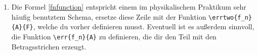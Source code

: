 \begin{enumerate}
\begin{loesung}
\begin{verbatim}
\renewcommand{\i}{\mathfrak{i}}
\newcommand{\complex}[1]{
  \re\left(#1\right)+\i\im\left(#1\right)}
\DeclareMathOperator{\re}{Re}
\DeclareMathOperator{\im}{Im}
                \end{verbatim}
            \end{loesung}
        \item Die Formel \eqref{fnfunction} entspricht einem im physikalischem 
            Praktikum sehr häufig benutztem Schema, ersetze diese Zeile mit der
            Funktion \verb|\errtwo{f_n}{A}{F}|, welche du vorher definieren musst.
            Eventuell ist es außerdem sinnvoll, die Funktion \verb|\err{f_n}{A}|
            zu definieren, die dir den Teil mit den Betragsstrichen erzeugt.
    \end{enumerate}